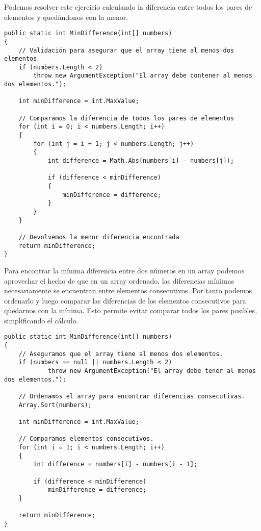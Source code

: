 Podemos resolver este ejercicio calculando la diferencia entre todos los pares de elementos y quedándonos con la menor.

\begin{lstlisting}
public static int MinDifference(int[] numbers)
{
    // Validación para asegurar que el array tiene al menos dos elementos
    if (numbers.Length < 2)
        throw new ArgumentException("El array debe contener al menos dos elementos.");
       
    int minDifference = int.MaxValue;

    // Comparamos la diferencia de todos los pares de elementos
    for (int i = 0; i < numbers.Length; i++)
    {
        for (int j = i + 1; j < numbers.Length; j++)
        {
            int difference = Math.Abs(numbers[i] - numbers[j]);
            
            if (difference < minDifference)
            {
                minDifference = difference;
            }
        }
    }
    
    // Devolvemos la menor diferencia encontrada
    return minDifference;
}
\end{lstlisting}

Para encontrar la mínima diferencia entre dos números en un array podemos aprovechar el hecho de que en un array ordenado, las diferencias mínimas necesariamente se encuentran entre elementos consecutivos. Por tanto podemos ordenarlo y luego comparar las diferencias de los elementos consecutivos para quedarnos con la mínima. Esto permite evitar comparar todos los pares posibles, simplificando el cálculo.

\begin{lstlisting}
public static int MinDifference(int[] numbers)
{
    // Aseguramos que el array tiene al menos dos elementos.
    if (numbers == null || numbers.Length < 2)
            throw new ArgumentException("El array debe tener al menos dos elementos.");
    
    // Ordenamos el array para encontrar diferencias consecutivas.
    Array.Sort(numbers);
    
    int minDifference = int.MaxValue;
    
    // Comparamos elementos consecutivos.
    for (int i = 1; i < numbers.Length; i++)
    {
        int difference = numbers[i] - numbers[i - 1];
        
        if (difference < minDifference)
            minDifference = difference;
    }
    
    return minDifference;
}
\end{lstlisting}